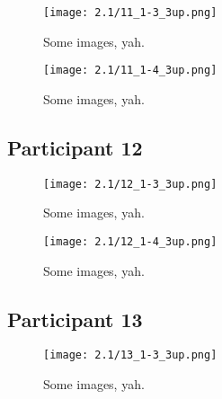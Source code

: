 \begin{figure}[h]
	\begin{center}
	\texttt{[image: 2.1/11\_1-3\_3up.png]}
	\caption{Some images, yah.}
	\end{center}
\end{figure}

\clearpage

\begin{figure}[h]
	\begin{center}
	\texttt{[image: 2.1/11\_1-4\_3up.png]}
	\caption{Some images, yah.}
	\end{center}
\end{figure}


\clearpage

\subsection{Participant 12}

\begin{figure}[h]
	\begin{center}
	\texttt{[image: 2.1/12\_1-3\_3up.png]}
	\caption{Some images, yah.}
	\end{center}
\end{figure}

\clearpage

\begin{figure}[h]
	\begin{center}
	\texttt{[image: 2.1/12\_1-4\_3up.png]}
	\caption{Some images, yah.}
	\end{center}
\end{figure}


\clearpage

\subsection{Participant 13}

\begin{figure}[h]
	\begin{center}
	\texttt{[image: 2.1/13\_1-3\_3up.png]}
	\caption{Some images, yah.}
	\end{center}
\end{figure}

